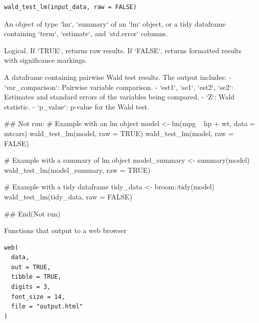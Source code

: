 \documentclass[a4paper]{book}
\begin{document}
%
\begin{Usage}
\begin{verbatim}
wald_test_lm(input_data, raw = FALSE)
\end{verbatim}
\end{Usage}
%
\begin{Arguments}
\begin{ldescription}
\item[\code{input\_data}] An object of type `lm`, `summary` of an `lm` object, or a tidy dataframe
containing `term`, `estimate`, and `std.error` columns.

\item[\code{raw}] Logical. If `TRUE`, returns raw results. If `FALSE`, returns formatted results with significance markings.
\end{ldescription}
\end{Arguments}
%
\begin{Value}
A dataframe containing pairwise Wald test results. The output includes:
- `var\_comparison`: Pairwise variable comparison.
- `est1`, `se1`, `est2`, `se2`: Estimates and standard errors of the variables being compared.
- `Z`: Wald statistic.
- `p\_value`: p-value for the Wald test.
\end{Value}
%
\begin{Examples}
\begin{ExampleCode}

## Not run: 
# Example with an lm object
model <- lm(mpg ~ hp + wt, data = mtcars)
wald_test_lm(model, raw = TRUE)
wald_test_lm(model, raw = FALSE)

# Example with a summary of lm object
model_summary <- summary(model)
wald_test_lm(model_summary, raw = TRUE)

# Example with a tidy dataframe
tidy_data <- broom::tidy(model)
wald_test_lm(tidy_data, raw = FALSE)

## End(Not run)
\end{ExampleCode}
\end{Examples}
%
\begin{Description}
Functions that output to a web browser
\end{Description}
%
\begin{Usage}
\begin{verbatim}
web(
  data,
  out = TRUE,
  tibble = TRUE,
  digits = 3,
  font_size = 14,
  file = "output.html"
)
\end{verbatim}
\end{Usage}
\end{document}
